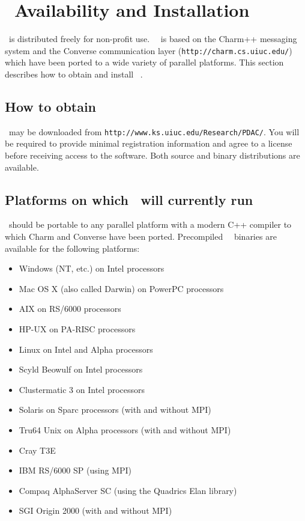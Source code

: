 
\section{\PDAC\ Availability and Installation}
\label{section:avail}

\PDAC\ is distributed freely for non-profit use.
\PDAC\ \PDACVERSION\ is based on the Charm++ messaging system and the
Converse communication layer ({\tt http://charm.cs.uiuc.edu/})
which have been ported to a wide variety of parallel platforms.
This section describes how to obtain and install \PDAC\ \PDACVERSION.

\subsection{How to obtain \PDAC}

\PDAC\ may be downloaded from {\tt http://www.ks.uiuc.edu/Research/PDAC/}.
You will be required to provide minimal registration information and
agree to a license before receiving access to the software.
Both source and binary distributions are available.

\subsection{Platforms on which \PDAC\ will currently run}
\PDAC\ should be portable to any parallel platform with a
modern C++ compiler to which Charm and Converse have been ported.
Precompiled \PDAC\ \PDACVERSION\ binaries are available for the following platforms:  
\begin{itemize}
\item Windows (NT, etc.) on Intel processors 
\item Mac OS X (also called Darwin) on PowerPC processors
\item AIX on RS/6000 processors 
\item HP-UX on PA-RISC processors 
\item Linux on Intel and Alpha processors 
\item Scyld Beowulf on Intel processors 
\item Clustermatic 3 on Intel processors 
\item Solaris on Sparc processors (with and without MPI)
\item Tru64 Unix on Alpha processors (with and without MPI)
\item Cray T3E 
\item IBM RS/6000 SP (using MPI)
\item Compaq AlphaServer SC (using the Quadrics Elan library)
\item SGI Origin 2000 (with and without MPI) 
\end{itemize}

